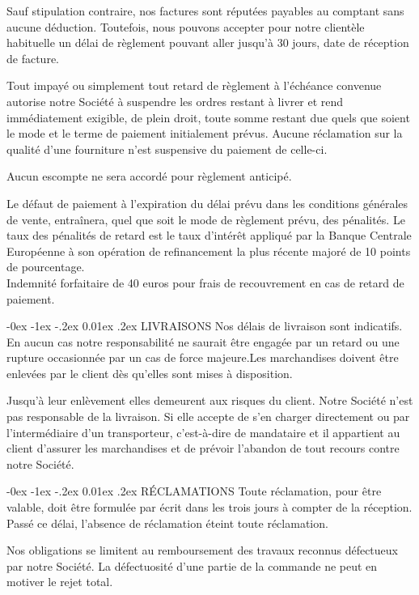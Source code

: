\documentclass[a4paper, oneside, 10pt, french]{article}
\makeatletter
\renewcommand{\section}{\@startsection {section}{1}{\z@}%
             {-0ex \@plus -1ex \@minus -.2ex}%
             {0.01ex \@plus.2ex}%
             {\normalfont\normalsize\sffamily}}
\makeatother
\begin{document}
\begin{multicols}{2}
\begin{small}
Sauf stipulation contraire, nos factures sont réputées payables au comptant sans aucune
déduction. Toutefois, nous pouvons accepter pour notre clientèle habituelle un délai de
règlement pouvant aller jusqu'à 30 jours, date de réception de facture.

Tout impayé ou simplement tout retard de règlement à l'échéance convenue autorise notre
Société à suspendre les ordres restant à livrer et rend immédiatement exigible, de plein droit,
toute somme restant due quels que soient le mode et le terme de paiement initialement prévus.
Aucune réclamation sur la qualité d'une fourniture n'est suspensive du paiement de celle-ci.

Aucun escompte ne sera accordé pour règlement anticipé.

Le défaut de paiement à l'expiration du délai prévu dans les conditions générales de vente,
entraînera, quel que soit le mode de règlement prévu, des pénalités. Le taux des pénalités de
retard est le taux d'intérêt appliqué par la Banque Centrale Européenne à son opération de
refinancement la plus récente majoré de 10 points de pourcentage. \\
Indemnité forfaitaire de 40 euros pour frais de recouvrement en cas de retard de paiement.

\section{LIVRAISONS}
Nos délais de livraison sont indicatifs. En aucun cas notre responsabilité ne saurait être
engagée par un retard ou une rupture occasionnée par un cas de force majeure.Les marchandises doivent être enlevées par le client dès qu'elles sont mises à disposition.

Jusqu'à leur enlèvement elles demeurent aux risques du client. Notre Société n'est pas
responsable de la livraison. Si elle accepte de s'en charger directement ou par l'intermédiaire
d'un transporteur, c'est-à-dire de mandataire et il appartient au client d'assurer les
marchandises et de prévoir l'abandon de tout recours contre notre Société.

\section{RÉCLAMATIONS}
Toute réclamation, pour être valable, doit être formulée par écrit dans les trois jours à compter
de la réception. Passé ce délai, l'absence de réclamation éteint toute réclamation.

Nos obligations se limitent au remboursement des travaux reconnus défectueux par notre
Société. La défectuosité d'une partie de la commande ne peut en motiver le rejet total.


\end{small}
\end{multicols}
\end{document}
